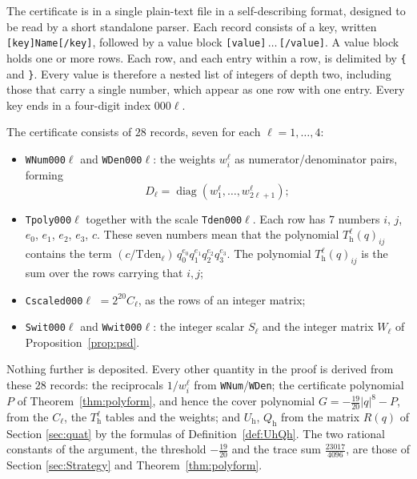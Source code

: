 \documentclass[reqno]{amsart}
\theoremstyle{definition}
\DeclareMathOperator{\diag}{diag}
\begin{document}
The certificate is in a single plain-text file in a self-describing format, designed to
be read by a short standalone parser. Each record consists of a key, written
\texttt{[key]Name[/key]}, followed by a value block \texttt{[value]}\,$\dots$\,\texttt{[/value]}.
A value block holds one or more rows. Each row, and each entry within a row, is delimited by
\texttt{\{} and \texttt{\}}. Every value is therefore a nested list of integers of depth
two, including those that carry a single number, which appear as one row with one entry. Every key
ends in a four-digit index $000\ell$.

The certificate consists of $28$ records, seven for each $\ell=1,\dots,4$:
\begin{itemize}[leftmargin=1.4em]
\item \texttt{WNum000$\ell$} and \texttt{WDen000$\ell$}: the weights $w^\ell_i$ as
numerator/denominator pairs, forming \[D_\ell=\diag(w^\ell_1,\dots,w^\ell_{2\ell+1});\]
\item \texttt{Tpoly000$\ell$} together with the scale \texttt{Tden000$\ell$}. Each row has 7 numbers
$i$, $j$, $e_0$, $e_1$, $e_2$, $e_3$, $c$. These seven numbers mean that the polynomial $T^\ell_{\mathrm h}(q)_{ij}$
contains the term  
$(c/\mathrm{Tden}_\ell)\,q_0^{e_0}q_1^{e_1}q_2^{e_2}q_3^{e_3}$. The polynomial $T^\ell_{\mathrm h}(q)_{ij}$ is the sum 
over the rows carrying that $i,j$;
\item \texttt{Cscaled000$\ell$} $=2^{20}C_\ell$, as the rows of an integer matrix;
\item \texttt{Swit000$\ell$} and \texttt{Wwit000$\ell$}: the integer scalar $S_\ell$ and the
integer matrix $W_\ell$ of Proposition~\ref{prop:psd}.
\end{itemize}

Nothing further is deposited. Every other quantity in the proof is derived from these $28$
records: the reciprocals $1/w^\ell_i$ from \texttt{WNum}/\texttt{WDen}; the certificate polynomial
$P$ of Theorem~\ref{thm:polyform}, and hence the cover polynomial $G=-\frac{19}{20}|q|^8-P$, from the
$C_\ell$, the $T^\ell_{\mathrm h}$ tables and the weights; and $U_{\mathrm h}$, $Q_{\mathrm h}$
from the matrix $R(q)$ of Section \ref{sec:quat} by the formulas of Definition~\ref{def:UhQh}. The two
rational constants of the argument, the threshold $-\tfrac{19}{20}$ and the trace sum
$\tfrac{23017}{4096}$, are those of Section \ref{sec:Strategy} and Theorem~\ref{thm:polyform}.
\end{document}
